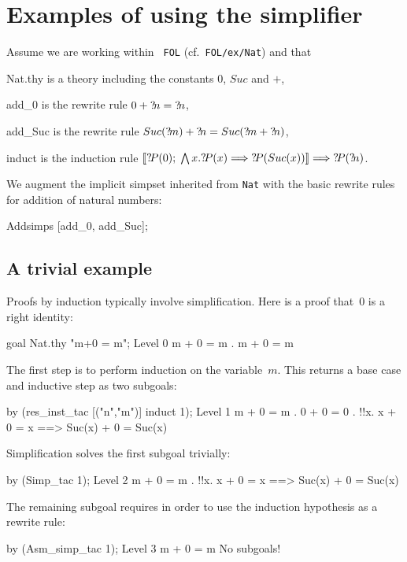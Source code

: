 \section{Examples of using the simplifier}
 Assume we are working within {\tt
  FOL} (cf.\ \texttt{FOL/ex/Nat}) and that
\begin{ttdescription}
\item[Nat.thy] 
  is a theory including the constants $0$, $Suc$ and $+$,
\item[add_0]
  is the rewrite rule $0+{?\!n} = {?\!n}$,
\item[add_Suc]
  is the rewrite rule $Suc({?\!m})+{?\!n} = Suc({?\!m}+{?\!n})$,
\item[induct]
  is the induction rule $\mathopen{[\![}{?\!P}(0);\; \bigwedge x. {?\!P}(x)\Longrightarrow
    {?\!P}(Suc(x))\mathclose{]\!]} \Longrightarrow {?\!P}({?\!n})$.
\end{ttdescription}
We augment the implicit simpset inherited from \texttt{Nat} with the
basic rewrite rules for addition of natural numbers:
\begin{ttbox}
Addsimps [add_0, add_Suc];
\end{ttbox}

\subsection{A trivial example}
Proofs by induction typically involve simplification.  Here is a proof
that~0 is a right identity:
\begin{ttbox}
goal Nat.thy "m+0 = m";
{\out Level 0}
{\out m + 0 = m}
{. m + 0 = m}
\end{ttbox}
The first step is to perform induction on the variable~$m$.  This returns a
base case and inductive step as two subgoals:
\begin{ttbox}
by (res_inst_tac [("n","m")] induct 1);
{\out Level 1}
{\out m + 0 = m}
{. 0 + 0 = 0}
{. !!x. x + 0 = x ==> Suc(x) + 0 = Suc(x)}
\end{ttbox}
Simplification solves the first subgoal trivially:
\begin{ttbox}
by (Simp_tac 1);
{\out Level 2}
{\out m + 0 = m}
{. !!x. x + 0 = x ==> Suc(x) + 0 = Suc(x)}
\end{ttbox}
The remaining subgoal requires  in order to use the
induction hypothesis as a rewrite rule:
\begin{ttbox}
by (Asm_simp_tac 1);
{\out Level 3}
{\out m + 0 = m}
{\out No subgoals!}
\end{ttbox}

